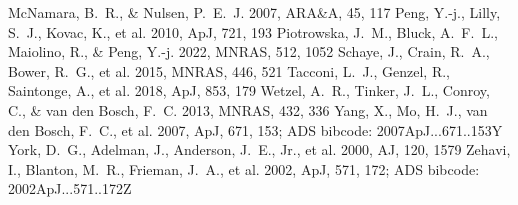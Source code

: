 \documentclass[twocolumn]{aastex631}
\begin{document}
\begin{thebibliography}{}
 McNamara, B.~R., \& Nulsen, P.~E.~J. 2007, ARA\&A, 45, 117
 Peng, Y.-j., Lilly, S.~J., Kovac, K., et al. 2010, ApJ, 721, 193
 Piotrowska, J.~M., Bluck, A.~F.~L., Maiolino, R., \& Peng, Y.-j. 2022, MNRAS, 512, 1052
 Schaye, J., Crain, R.~A., Bower, R.~G., et al. 2015, MNRAS, 446, 521
 Tacconi, L.~J., Genzel, R., Saintonge, A., et al. 2018, ApJ, 853, 179
 Wetzel, A.~R., Tinker, J.~L., Conroy, C., \& van den Bosch, F.~C. 2013, MNRAS, 432, 336
 Yang, X., Mo, H.~J., van den Bosch, F.~C., et al. 2007, ApJ, 671, 153; ADS bibcode: 2007ApJ...671..153Y
 York, D.~G., Adelman, J., Anderson, J.~E., Jr., et al. 2000, AJ, 120, 1579
 Zehavi, I., Blanton, M.~R., Frieman, J.~A., et al. 2002, ApJ, 571, 172; ADS bibcode: 2002ApJ...571..172Z
\end{thebibliography}
\end{document}
